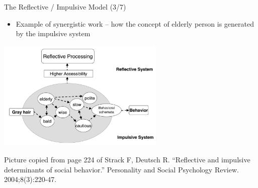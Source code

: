\documentclass{beamer}
\begin{document}
\begin{frame}
{\centerline{The Reflective / Impulsive Model (3/7)}}
\begin{itemize}
    \item Example of synergistic work -- how the concept of elderly person is generated by the impulsive system
\end{itemize} 

\begin{center}

 \includegraphics[width=8cm]{P2023.AIBCCSS.KnowledgeAcquisitionRetentionUse/RI.IdentifyingElderly.Impulsive.jpg}
 
\end{center}

\begin{center}
    \tiny{Picture copied from page 224 of Strack F, Deutsch R. ``Reflective and impulsive determinants of social behavior.'' Personality and Social Psychology Review. 2004;8(3):220-47.}
    \end{center}

\end{frame}
\end{document}
